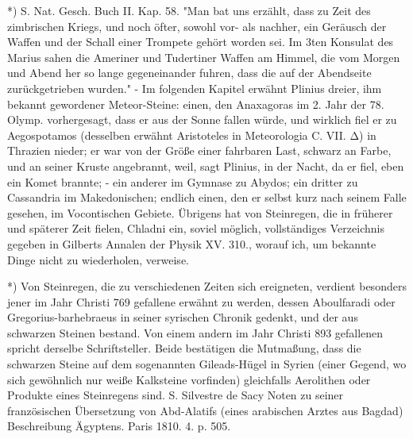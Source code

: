 \documentclass[a4paper, 11pt, oneside, polutonikogreek, german]{article}
\begin{document}
*) S. Nat. Gesch. Buch II. Kap. 58. "Man bat uns erzählt, dass zu Zeit des zimbrischen Kriegs, und noch öfter, sowohl vor- als nachher, ein Geräusch der Waffen und der Schall einer Trompete gehört worden sei. Im 3ten Konsulat des Marius sahen die Ameriner und Tudertiner Waffen am Himmel, die vom Morgen und Abend her so lange gegeneinander fuhren, dass die auf der Abendseite zurückgetrieben wurden." - Im folgenden Kapitel erwähnt Plinius dreier, ihm bekannt gewordener Meteor-Steine: einen, den Anaxagoras im 2. Jahr der 78. Olymp. vorhergesagt, dass er aus der Sonne fallen würde, und wirklich fiel er zu Aegospotamos (desselben erwähnt Aristoteles in Meteorologia C. VII. Δ) in Thrazien nieder; er war von der Größe einer fahrbaren Last, schwarz an Farbe, und an seiner Kruste angebrannt, weil, sagt Plinius, in der Nacht, da er fiel, eben ein Komet brannte; - ein anderer im Gymnase zu Abydos; ein dritter zu Cassandria im Makedonischen; endlich einen, den er selbst kurz nach seinem Falle gesehen, im Vocontischen Gebiete. Übrigens hat von Steinregen, die in früherer und späterer Zeit fielen, Chladni ein, soviel möglich, vollständiges Verzeichnis gegeben in Gilberts Annalen der Physik XV. 310., worauf ich, um bekannte Dinge nicht zu wiederholen, verweise.

*) Von Steinregen, die zu verschiedenen Zeiten sich ereigneten, verdient besonders jener im Jahr Christi 769 gefallene erwähnt zu werden, dessen Aboulfaradi oder Gregorius-barhebraeus in seiner syrischen Chronik gedenkt, und der aus schwarzen Steinen bestand. Von einem andern im Jahr Christi 893 gefallenen spricht derselbe Schriftsteller. Beide bestätigen die Mutmaßung, dass die schwarzen Steine auf dem sogenannten Gileads-Hügel in Syrien (einer Gegend, wo sich gewöhnlich nur weiße Kalksteine vorfinden) gleichfalls Aerolithen oder Produkte eines Steinregens sind. S. Silvestre de Sacy Noten zu seiner französischen Übersetzung von Abd-Alatifs (eines arabischen Arztes aus Bagdad) Beschreibung Ägyptens. Paris 1810. 4. p. 505.
\end{document}
